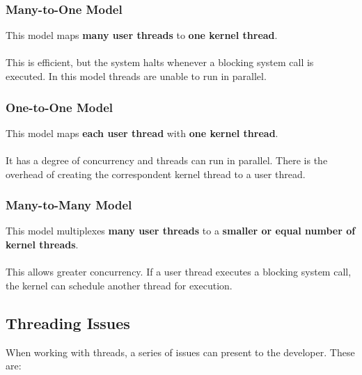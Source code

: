 \documentclass{article}
\begin{document}
\subsubsection{Many-to-One Model}
This model maps \textbf{many user threads} to \textbf{one kernel thread}. \\ \\
This is efficient, but the system halts whenever a blocking system call is executed. In this model threads are unable to run in parallel.

\subsubsection{One-to-One Model}
This model maps \textbf{each user thread} with \textbf{one kernel thread}. \\ \\
It has a degree of concurrency and threads can run in parallel. There is the overhead of creating the correspondent kernel thread to a user thread.

\subsubsection{Many-to-Many Model}
This model multiplexes \textbf{many user threads} to a \textbf{smaller or equal number of kernel threads}. \\ \\
This allows greater concurrency. If a user thread executes a blocking system call, the kernel can schedule another thread for execution.

\subsection{Threading Issues}
When working with threads, a series of issues can present to the developer. These are:
\end{document}
